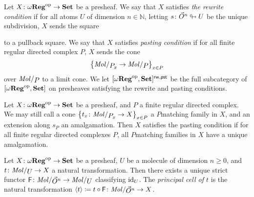 \begin{dfn}  \label{dfn:rewrite_condition}
    Let \( X \colon \omega\mathbf{Reg}^\mathrm{op} \to \mathbf{Set} \) be a presheaf. 
    We say that \( X \) satisfies \emph{the rewrite condition} if for all atoms \( U \) of dimension \( n \in \mathbb{N} \), letting \( s \colon \vec{O}^{n} \looparrowright U \) be the unique subdivision, \( X \) sends the square
    \begin{center}
    \end{center}
    to a pullback square.
    We say that \( X \) satisfies \emph{pasting condition} if for all finite regular directed complex \( P \), \( X \) sends the cone 
    \begin{equation*}
        \set{\molecin{\imel{P}{x}} \to \molecin{P}}_{x \in P}
    \end{equation*}
    over \( \molecin{P} \) to a limit cone.
    We let \( [\omega\mathbf{Reg}^\mathrm{op}, \mathbf{Set}]^{\mathsf{rw, pst}} \) be the full subcategory of \( [\omega\mathbf{Reg}^\mathrm{op}, \mathbf{Set}] \) on presheaves satisfying the rewrite and pasting conditions.
\end{dfn}

\begin{rmk}
    Let \( X \colon \omega\mathbf{Reg}^\mathrm{op} \to \mathbf{Set} \) be a presheaf, and \( P \) a finite regular directed complex. 
    We may still call a cone \( \set{t_x \colon \molecin{\imel{P}{x}} \to X}_{x \in P} \) a \( P \)\nbd matching family in \( X \), and an extension along \( s_P \) an amalgamation.
    Then \( X \) satisfies the pasting condition if for all finite regular directed complexes \( P \), all \( P \)\nbd matching families in \( X \) have a unique amalgamation.
\end{rmk}

\begin{dfn}
    Let \( X \colon \omega\mathbf{Reg}^\mathrm{op} \to \mathbf{Set} \) be a presheaf, \( U \) be a molecule of dimension \( n \geq 0 \), and \( t \colon \molecin{U} \to X \) a natural transformation.
    Then there exists a unique strict functor \( \F \colon \molecin{\dglobe{n}} \to \molecin{U} \) classifying \( \mathrm{id}_{U} \).
    The \emph{principal cell of \( t \)} is the natural transformation \( \pcell{t} \eqdef t \after \F \colon \molecin{\dglobe{n}} \to X \).
\end{dfn}


